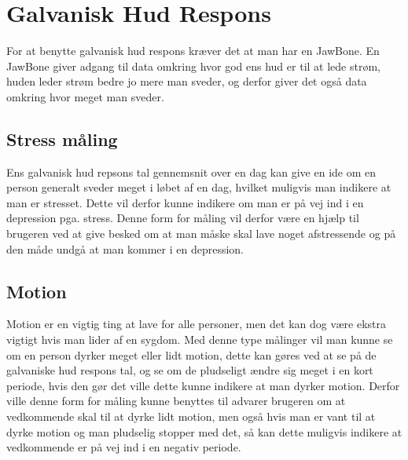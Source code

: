 \section{Galvanisk Hud Respons}
For at benytte galvanisk hud respons kræver det at man har en JawBone.
En JawBone giver adgang til data omkring hvor god ens hud er til at lede strøm, huden leder strøm bedre jo mere man sveder, og derfor giver det også data omkring hvor meget man sveder.


\subsection{Stress måling}
Ens galvanisk hud repsons tal gennemsnit over en dag kan give en ide om en person generalt sveder meget i løbet af en dag, hvilket muligvis man indikere at man er stresset.
Dette vil derfor kunne indikere om man er på vej ind i en depression pga. stress.
Denne form for måling vil derfor være en hjælp til brugeren ved at give besked om at man måske skal lave noget afstressende og på den måde undgå at man kommer i en depression.

\subsection{Motion}
Motion er en vigtig ting at lave for alle personer, men det kan dog være ekstra vigtigt hvis man lider af en sygdom.
Med denne type målinger vil man kunne se om en person dyrker meget eller lidt motion, dette kan gøres ved at se på de galvaniske hud respons tal, og se om de pludseligt ændre sig meget i en kort periode, hvis den gør det ville dette kunne indikere at man dyrker motion.
Derfor ville denne form for måling kunne benyttes til advarer brugeren om at vedkommende skal til at dyrke lidt motion, men også hvis man er vant til at dyrke motion og man pludselig stopper med det, så kan dette muligvis indikere at vedkommende er på vej ind i en negativ periode.

